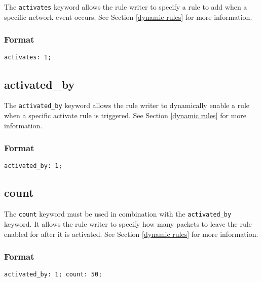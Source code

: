 \documentclass[english]{report}
\begin{document}
The \texttt{activates} keyword allows the rule writer to specify a rule to add when
a specific network event occurs. See Section \ref{dynamic rules} for more information.

\subsubsection{Format}

\begin{verbatim}
activates: 1;
\end{verbatim}

\subsection{activated\_by}

The \texttt{activated\_by} keyword allows the rule writer to dynamically enable a rule when
a specific activate rule is triggered.  See Section \ref{dynamic rules} for more information.

\subsubsection{Format}

\begin{verbatim}
activated_by: 1;
\end{verbatim}

\subsection{count}

The \texttt{count} keyword must be used in combination with the \texttt{activated\_by} keyword.
It allows the rule writer to specify how many packets to leave the rule 
enabled for after it is activated.  See Section \ref{dynamic rules} for more information.

\subsubsection{Format}

\begin{verbatim}
activated_by: 1; count: 50;
\end{verbatim}
\end{document}
